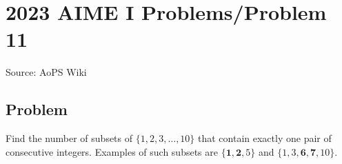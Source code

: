 \documentclass[12pt]{article}
\begin{document}
\section*{{2023 AIME I Problems/Problem 11}}
Source: AoPS Wiki

\subsection*{Problem}
Find the number of subsets of $\{1,2,3,\ldots,10\}$ that contain exactly one pair of consecutive integers. Examples of such subsets are $\{\mathbf{1},\mathbf{2},5\}$ and $\{1,3,\mathbf{6},\mathbf{7},10\}.$
\end{document}

